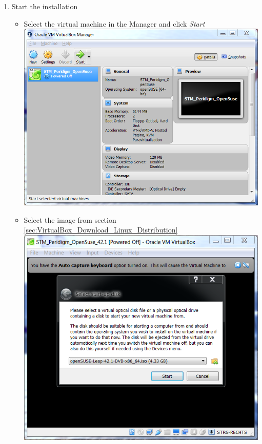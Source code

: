 \begin{enumerate}[noitemsep]
 \item Start the installation
 \begin{itemize}
   \item Select the virtual machine in the \marktool{\virtualboxname} Manager and click \textit{Start}\\
   \includegraphics[scale=\screenshotscalefac]{Figures/VirtualBox_VirtualMachine_OperatingSystem_Start}
   \item Select the \marktool{\opensusename} image from section \ref{sec:VirtualBox_Download_Linux_Distribution}\\
   \includegraphics[scale=\screenshotscalefac]{Figures/VirtualBox_VirtualMachine_OperatingSystem_SelectDisk}

\end{itemize}
\end{enumerate}
